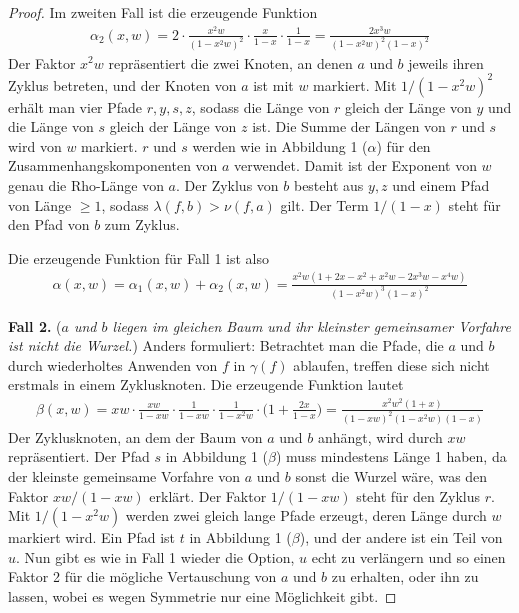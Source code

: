 \documentclass[a4paper, 10pt, ngerman]{article}
\begin{document}
\begin{proof}
    Im zweiten Fall ist die erzeugende Funktion
    \begin{align*}
        \alpha_2(x, w) = 2 \cdot \frac {x^2w} {(1 - x^2w)^2} \cdot  \frac x {1 - x} \cdot \frac {1}{1 - x} = \frac {2x^3w} {(1 - x^2w)^2 (1 - x)^2}
    \end{align*}
    Der Faktor $x^2w$ repräsentiert die zwei Knoten, an denen $a$ und $b$ jeweils ihren Zyklus betreten, und der Knoten von $a$ ist mit $w$ markiert. Mit $1 / (1 - x^2w)^2$ erhält man vier Pfade $r, y, s, z$, sodass die Länge von $r$ gleich der Länge von $y$ und die Länge von $s$ gleich der Länge von $z$ ist. Die Summe der Längen von $r$ und $s$ wird von $w$ markiert. $r$ und $s$ werden wie in Abbildung 1 ($\alpha$) für den Zusammenhangskomponenten von $a$ verwendet. Damit ist der Exponent von $w$ genau die Rho-Länge von $a$. Der Zyklus von $b$ besteht aus $y, z$ und einem Pfad von Länge $\ge 1$, sodass $\lambda(f, b) > \nu(f, a)$ gilt. Der Term $1 / (1 - x)$ steht für den Pfad von $b$ zum Zyklus.

    Die erzeugende Funktion für Fall 1 ist also
    \begin{align*}
        \alpha(x, w)
        = \alpha_1(x, w) + \alpha_2(x, w)
        = \frac {x^2w(1 + 2x - x^2 + x^2w - 2x^3w - x^4w)} {(1 - x^2w)^3(1 - x)^2}
    \end{align*}

    \textbf{Fall 2.} (\emph{$a$ und $b$ liegen im gleichen Baum und ihr kleinster gemeinsamer Vorfahre ist nicht die Wurzel.}) Anders formuliert: Betrachtet man die Pfade, die $a$ und $b$ durch wiederholtes Anwenden von $f$ in $\gamma(f)$ ablaufen, treffen diese sich nicht erstmals in einem Zyklusknoten. Die erzeugende Funktion lautet
    \begin{align*}
        \beta(x, w)
        = xw \cdot \frac {xw} {1 - xw} \cdot \frac {1} {1 - xw} \cdot \frac {1} {1 - x^2w} \cdot \Bigg (1 + \frac {2x} {1 - x} \Bigg )
        = \frac {x^2w^2(1 + x)} {(1 - xw)^2(1 - x^2w)(1 - x)}
    \end{align*}
    Der Zyklusknoten, an dem der Baum von $a$ und $b$ anhängt, wird durch $xw$ repräsentiert. Der Pfad $s$ in Abbildung 1 ($\beta$) muss mindestens Länge 1 haben, da der kleinste gemeinsame Vorfahre von $a$ und $b$ sonst die Wurzel wäre, was den Faktor $xw/(1 - xw)$ erklärt. Der Faktor $1/(1 - xw)$ steht für den Zyklus $r$. Mit $1/(1 - x^2w)$ werden zwei gleich lange Pfade erzeugt, deren Länge durch $w$ markiert wird. Ein Pfad ist $t$ in Abbildung 1 ($\beta$), und der andere ist ein Teil von $u$. Nun gibt es wie in Fall 1 wieder die Option, $u$ echt zu verlängern und so einen Faktor 2 für die mögliche Vertauschung von $a$ und $b$ zu erhalten, oder ihn zu lassen, wobei es wegen Symmetrie nur eine Möglichkeit gibt.


\end{proof}
\end{document}
